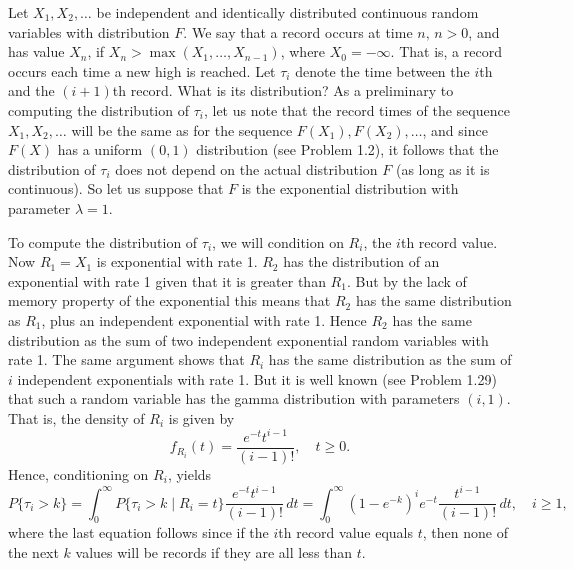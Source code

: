 \documentclass[lang=cn,10pt,thmcnt=section]{elegantbook}
\begin{document}
\begin{example}
	Let $X_1, X_2, \ldots$ be independent and identically distributed continuous random variables with distribution $F$. We say that a record occurs at time $n, \, n > 0$, and has value $X_n$, if $X_n > \max(X_1, \ldots, X_{n-1})$, where $X_0 = -\infty$. That is, a record occurs each time a new high is reached. Let $\tau_i$ denote the time between the $i$th and the $(i + 1)$th record. What is its distribution?
As a preliminary to computing the distribution of $\tau_i$, let us note that the record times of the sequence $X_1, X_2, \ldots$ will be the same as for the sequence $F(X_1), F(X_2), \ldots$, and since $F(X)$ has a uniform $(0, 1)$ distribution (see Problem 1.2), it follows that the distribution of $\tau_i$ does not depend on the actual distribution $F$ (as long as it is continuous). So let us suppose that $F$ is the exponential distribution with parameter $\lambda = 1$.

To compute the distribution of $\tau_i$, we will condition on $R_i$, the $i$th record value. Now $R_1 = X_1$ is exponential with rate 1. $R_2$ has the distribution of an exponential with rate 1 given that it is greater than $R_1$. But by the lack of memory property of the exponential this means that $R_2$ has the same distribution as $R_1$, plus an independent exponential with rate 1. Hence $R_2$ has the same distribution as the sum of two independent exponential random variables with rate 1. The same argument shows that $R_i$ has the same distribution as the sum of $i$ independent exponentials with rate 1. But it is well known (see Problem 1.29) that such a random variable has the gamma distribution with parameters $(i, 1)$. That is, the density of $R_i$ is given by
\[
f_{R_i}(t) = \frac{e^{-t} t^{i-1}}{(i-1)!}, \quad t \geq 0.
\]
Hence, conditioning on $R_i$, yields
\[
P\{\tau_i > k\} = \int_{0}^{\infty} P\{\tau_i > k \mid R_i = t\} \frac{e^{-t} t^{i-1}}{(i-1)!} \, dt = \int_{0}^{\infty} (1 - e^{-k})^i e^{-t} \frac{t^{i-1}}{(i-1)!} \, dt, \quad i \geq 1,
\]
where the last equation follows since if the $i$th record value equals $t$, then none of the next $k$ values will be records if they are all less than $t$.


\end{example}
\end{document}
